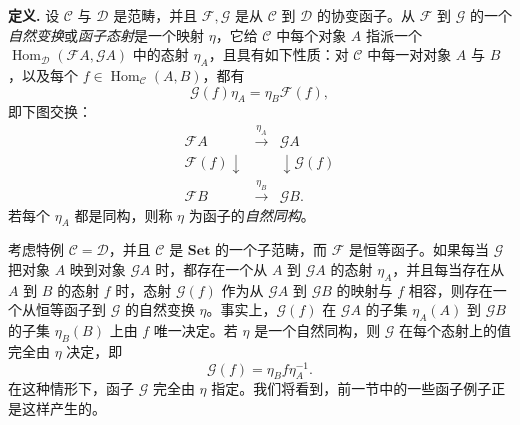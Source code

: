 \noindent\textbf{定义.} 设 $\mathcal C$ 与 $\mathcal D$ 是范畴，并且 $\mathcal F,\mathcal G$ 是从 $\mathcal C$ 到 $\mathcal D$ 的协变函子。从 $\mathcal F$ 到 $\mathcal G$ 的一个\emph{自然变换}或\emph{函子态射}是一个映射 $\eta$，它给 $\mathcal C$ 中每个对象 $A$ 指派一个 $\operatorname{Hom}_{\mathcal D}(\mathcal F A,\mathcal G A)$ 中的态射 $\eta_A$，且具有如下性质：对 $\mathcal C$ 中每一对对象 $A$ 与 $B$，以及每个 $f\in\operatorname{Hom}_{\mathcal C}(A,B)$，都有
\[
  \mathcal G(f)\eta_A=\eta_B\mathcal F(f),
\]
即下图交换：
\[
\begin{array}{ccc}
\mathcal F A & \xrightarrow{\eta_A} & \mathcal G A\\
\mathcal F(f)\downarrow && \downarrow\mathcal G(f)\\
\mathcal F B & \xrightarrow{\eta_B} & \mathcal G B.
\end{array}
\]
若每个 $\eta_A$ 都是同构，则称 $\eta$ 为函子的\emph{自然同构}。

考虑特例 $\mathcal C=\mathcal D$，并且 $\mathcal C$ 是 $\mathbf{Set}$ 的一个子范畴，而 $\mathcal F$ 是恒等函子。如果每当 $\mathcal G$ 把对象 $A$ 映到对象 $\mathcal G A$ 时，都存在一个从 $A$ 到 $\mathcal G A$ 的态射 $\eta_A$，并且每当存在从 $A$ 到 $B$ 的态射 $f$ 时，态射 $\mathcal G(f)$ 作为从 $\mathcal G A$ 到 $\mathcal G B$ 的映射与 $f$ 相容，则存在一个从恒等函子到 $\mathcal G$ 的自然变换 $\eta$。事实上，$\mathcal G(f)$ 在 $\mathcal G A$ 的子集 $\eta_A(A)$ 到 $\mathcal G B$ 的子集 $\eta_B(B)$ 上由 $f$ 唯一决定。若 $\eta$ 是一个自然同构，则 $\mathcal G$ 在每个态射上的值完全由 $\eta$ 决定，即
\[
  \mathcal G(f)=\eta_Bf\eta_A^{-1}.
\]
在这种情形下，函子 $\mathcal G$ 完全由 $\eta$ 指定。我们将看到，前一节中的一些函子例子正是这样产生的。


